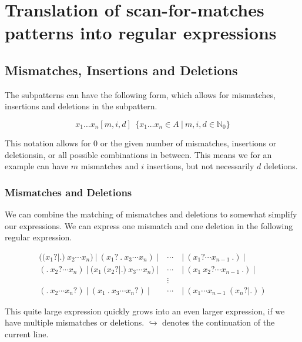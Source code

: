 \documentclass[12pt]{article}
\begin{document}
\newpage

\section{Translation of scan-for-matches patterns into regular expressions}

\subsection{Mismatches, Insertions and Deletions}

The subpatterns can have the following form, which allows for mismatches, insertions and deletions in the subpattern. 

\begin{equation}
	x_1 \ldots x_n[m, i, d] \ \ \{ x_1 \ldots x_n \in A \ | \ m, i, d \in \mathbb{N}_0 \}
\end{equation} 

This notation allows for 0 or the given number of mismatches, insertions or deletionsin, or all possible combinations in between. This means we for an example can have $m$ mismatches and $i$ insertions, but not necessarily $d$ deletions.

\subsubsection{Mismatches and Deletions}

We can combine the matching of mismatches and deletions to somewhat simplify our expressions.
We can express one mismatch and one deletion in the following regular expression.

\begin{eqnarray}
	((x_1?|.) \ x_2 \cdots x_n) \ | \ (x_1? \ . \ x_3 \cdots x_n) \ | \ & \cdots & \ | \ (x_1? \cdots x_{n-1} \ .) \ | \\
	(. \ x_2? \cdots x_n) \ | \ (x_1 \ (x_2?|.) \ x_3 \cdots x_n) \ | \ & \cdots & \ | \ (x_1 \ x_2? \cdots x_{n-1} \ .) \ | \\
	& \vdots & \nonumber \\
	(. \ x_2 \cdots x_n?) \ | \ (x_1 \ . \ x_3 \cdots x_n?) \ | \ & \cdots & \ | \ (x_1 \cdots x_{n-1} \ (x_n?|.))
\end{eqnarray}

This quite large expression quickly grows into an even larger expression, if we have multiple mismatches or deletions. $\hookrightarrow$ denotes the continuation of the current line.
\end{document}
